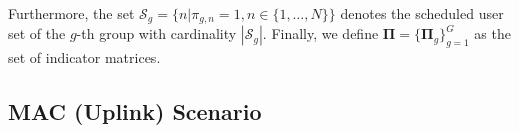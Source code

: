 Furthermore, the set $\mathcal{S}_g=\{n|\pi_{g,n}=1, n\in\{1,\ldots,N\}\}$ 
denotes the scheduled
user set of the $g$-th group with cardinality
$|\mathcal{S}_g|$.
Finally, we define $\bm{\Pi}=\{\bm{\Pi}_g\}_{g=1}^G$ as the set of indicator matrices.


\subsection{MAC (Uplink) Scenario} 

